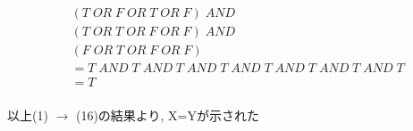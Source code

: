 \documentclass[dvipdfmx,10pt, a4j]{jarticle}
\theoremstyle{definition}
\begin{document}
\begin{enumerate}[i)]
\begin{enumerate}[1)]
\begin{align*}
                & (T\; OR\; F\; OR\; T\; OR\; F)\; AND\\
                & (T\; OR\; T\; OR\; F\; OR\; F)\; AND\\
                & (F\; OR\; T\; OR\; F\; OR\; F)\\
                &= T\; AND\; T\; AND\; T\; AND\; T\; AND\; T\; AND\; T\; AND\; T\; AND\; T\\
                &= T\\
            \end{align*}
        \end{enumerate}
        以上(1) $\to$ (16)の結果より, X=Yが示された\\
    \end{enumerate}
    
\end{document}
